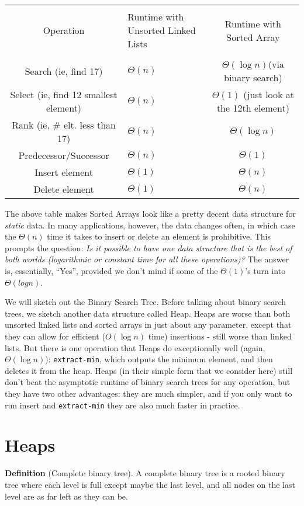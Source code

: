 \documentclass [12pt]{article}
\begin{document}
\begin{center}
\begin{tabular}{|c|p{2.4cm}|c|}
\hline \\
Operation & Runtime with Unsorted Linked Lists & Runtime with Sorted Array \\
\hline \\
Search (ie, find 17) & $\Theta(n)$ & $\Theta(\log n)$(via binary search) \\
Select (ie, find 12 smallest element) & $\Theta(n)$ & $\Theta(1)$ (just look at the 12th element) \\
Rank (ie, \# elt. less than 17) & $\Theta(n)$ & $\Theta(\log n)$\\
Predecessor/Successor & $\Theta(n)$ & $\Theta(1)$ \\
Insert element & $\Theta(1)$ & $\Theta(n)$ \\
Delete element & $\Theta(1)$ & $\Theta(n)$ \\
\hline
\end{tabular}
\end{center}


The above table makes Sorted Arrays look like a pretty decent data structure for \textit{static} data. In many applications, however, the data changes often, in which case the $\Theta(n)$ time it takes to insert or delete an element is prohibitive. This prompts the question: \textit{Is it possible to have one data structure that is the best of both worlds (logarithmic or constant time for all these operations)?} The answer is, essentially, ``Yes'', provided we don’t mind if some of the $\Theta(1)$’s turn into $\Theta(log n)$. 

We will sketch out the Binary Search Tree. Before talking about binary search trees, we sketch another data structure called Heap. Heaps are worse than both unsorted linked lists and sorted arrays in just about any parameter, except that they can allow for efficient ($O(\log n)$ time) insertions - still worse than linked lists. But there is one operation that Heaps do exceptionally well (again, $\Theta(\log n)$): \texttt{extract-min}, which outputs the minimum element, and then deletes it from the heap. Heaps (in their simple form that we consider here) still don't beat the asymptotic runtime of binary search trees for any operation, but they have two other advantages: they are much simpler, and if you only want to run insert and \texttt{extract-min} they are also much faster in practice.

\section{Heaps} \textbf{Definition} (Complete binary tree). A complete binary tree is a rooted binary tree where each level is full except maybe the last level, and all nodes on the last level are as far left as they can be.
\end{document}
